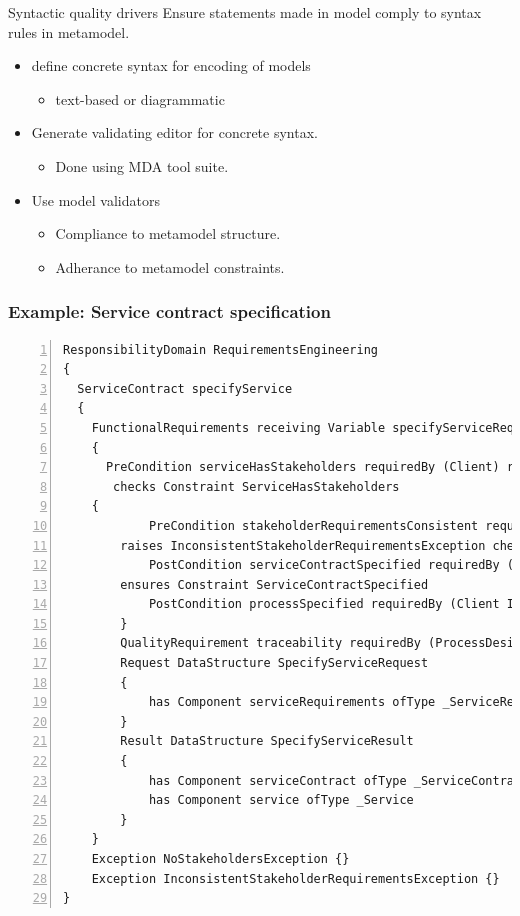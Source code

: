 \documentclass[a4]{article}
\begin{document}

\begin{frame}{Syntactic quality drivers}
  Ensure statements made in model comply to syntax rules in metamodel.
  \pause
  \begin{itemize} 
    \item<+-| alert@+> define concrete syntax for encoding of models 
      \begin{itemize}
	\item text-based or diagrammatic
      \end{itemize}
    \item<+-| alert@+> Generate validating editor for concrete syntax.
      \begin{itemize}
	\item Done using MDA tool suite.
      \end{itemize}
    \item<+-| alert@+> Use model validators
      \begin{itemize}
	\item Compliance to metamodel structure.
	\item Adherance to metamodel constraints.
      \end{itemize}
  \end{itemize}
\end{frame}


\begin{frame}[fragile]
\frametitle{Example: Service contract specification}

\lstset{language=urdad,label=serviceTextSyntax}
\begin{lstlisting}[numbers=left,escapechar=|]
ResponsibilityDomain RequirementsEngineering
{
  ServiceContract specifyService
  {
    FunctionalRequirements receiving Variable specifyServiceRequest ofType SpecifyServiceRequest
    {
      PreCondition serviceHasStakeholders requiredBy (Client) raises NoStakeholdersException 
       checks Constraint ServiceHasStakeholders
	{
            PreCondition stakeholderRequirementsConsistent requiredBy (Client Implementation Testing) 
		raises InconsistentStakeholderRequirementsException checks Constraint RequirementsConsistent
            PostCondition serviceContractSpecified requiredBy (Client Implementation Testing) 
		ensures Constraint ServiceContractSpecified
            PostCondition processSpecified requiredBy (Client Implementation) ensures Constraint ProcessSpecified
        }
        QualityRequirement traceability requiredBy (ProcessDesign ProjectManagement Development)
        Request DataStructure SpecifyServiceRequest
        {
            has Component serviceRequirements ofType _ServiceRequirements
        }
        Result DataStructure SpecifyServiceResult
        {
            has Component serviceContract ofType _ServiceContract
            has Component service ofType _Service
        }
    }
    Exception NoStakeholdersException {}
    Exception InconsistentStakeholderRequirementsException {}
}
\end{lstlisting}
\end{frame}
\end{document}
